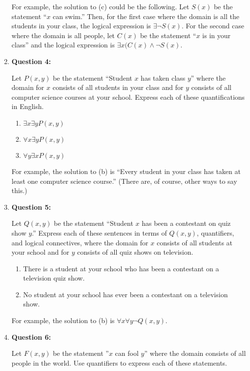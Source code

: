 \documentclass[11pt]{article}
\begin{document}
\begin{enumerate}
For example, the solution to (c) could be the following. Let $S(x)$ be the statement ``$x$ can swim.'' Then, for the first case where the domain is all the students in your class, the logical expression is $\exists \lnot S(x)$. For the second case where the domain is all people, let $C(x)$ be the statement ``$x$ is in your class'' and the logical expression is $\exists x (C(x) \land \lnot S(x)$. 

\item
\textbf{Question 4:}

Let $P(x,y)$ be the statement ``Student $x$ has taken class $y$'' where the domain for $x$ consists of all students in your class and for $y$ consists of all computer science courses at your school. Express each of these quantifications in English.

\begin{enumerate}[label=(\alph*)]
\item $\exists x \exists y P(x,y)$
\item $\forall x \exists y P(x,y)$
\item $\forall y \exists x P(x,y)$
\end{enumerate}

For example, the solution to (b) is ``Every student in your class has taken at least one computer science course.'' (There are, of course, other ways to say this.)

\item
\textbf{Question 5:}

Let $Q(x,y)$ be the statement ``Student $x$ has been a contestant on quiz show $y$.'' Express each of these sentences in terms of $Q(x,y)$, quantifiers, and logical connectives, where the domain for $x$ consists of all students at your school and for $y$ consists of all quiz shows on television.

\begin{enumerate}[label=(\alph*)]
\item There is a student at your school who has been a contestant on a television quiz show.
\item No student at your school has ever been a contestant on a television show.
\end{enumerate}

For example, the solution to (b) is $\forall x \forall y \lnot Q(x,y)$.

\item
\textbf{Question 6:}

Let $F(x,y)$ be the statement ''$x$ can fool $y$'' where the domain consists of all people in the world. Use quantifiers to express each of these statements.


\end{enumerate}
\end{document}
